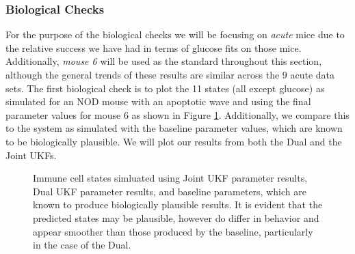 \documentclass{article}
\begin{document}
\subsubsection{Biological Checks} \label{section:T1D_Biological_Checks}
For the purpose of the biological checks we will be focusing on \emph{acute} mice due to the relative success we have had in terms of glucose fits on those mice. Additionally, \emph{mouse 6} will be used as the standard throughout this section, although the general trends of these results are similar across the 9 acute data sets. The first biological check is to plot the 11 states (all except glucose) as simulated for an NOD mouse with an apoptotic wave and using the final parameter values for mouse 6 as shown in Figure \ref{fig:T1D_StatesWithWave}. Additionally, we compare this to the system as simulated with the baseline parameter values, which are known to be biologically plausible. We will plot our results from both the Dual and the Joint UKFs. \\

\begin{figure}[H]
    \centering
    \hfill
    \hfill
    \caption{Immune cell states simluated using Joint UKF parameter results, Dual UKF parameter results, and baseline parameters, which are known to produce biologically plausible results. It is evident that the predicted states may be plausible, however do differ in behavior and appear smoother than those produced by the baseline, particularly in the case of the Dual.}
    \label{fig:T1D_StatesWithWave}

\end{figure}
\end{document}
